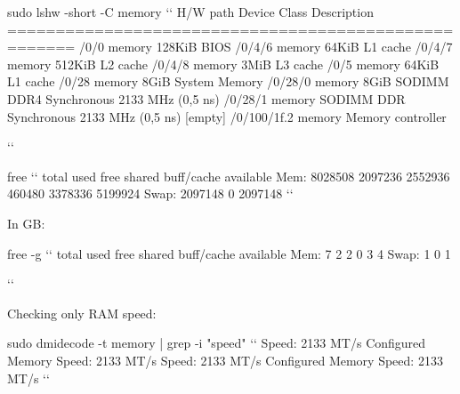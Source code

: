 \documentclass[]{article}
\begin{document}




















\begin{ubuntu}
sudo lshw -short -C memory `\StartConsole`
H/W path       Device      Class          Description
=====================================================
/0/0                       memory         128KiB BIOS
/0/4/6                     memory         64KiB L1 cache
/0/4/7                     memory         512KiB L2 cache
/0/4/8                     memory         3MiB L3 cache
/0/5                       memory         64KiB L1 cache
/0/28                      memory         8GiB System Memory
/0/28/0                    memory         8GiB SODIMM DDR4 Synchronous 2133 MHz (0,5 ns)
/0/28/1                    memory         SODIMM DDR Synchronous 2133 MHz (0,5 ns) [empty]
/0/100/1f.2                memory         Memory controller

``
\end{ubuntu}

\begin{ubuntu}
free `\StartConsole`
               total        used        free      shared  buff/cache   available
Mem:         8028508     2097236     2552936      460480     3378336     5199924
Swap:        2097148           0     2097148
``
\end{ubuntu}
In GB:
\begin{ubuntu}
free -g `\StartConsole`
               total        used        free      shared  buff/cache   available
Mem:               7           2           2           0           3           4
Swap:              1           0           1

``
\end{ubuntu}


Checking only RAM speed:
\begin{ubuntu}
sudo dmidecode -t memory | grep -i "speed" `\StartConsole`
	Speed: 2133 MT/s
	Configured Memory Speed: 2133 MT/s
	Speed: 2133 MT/s
	Configured Memory Speed: 2133 MT/s
``
\end{ubuntu}
\end{document}
